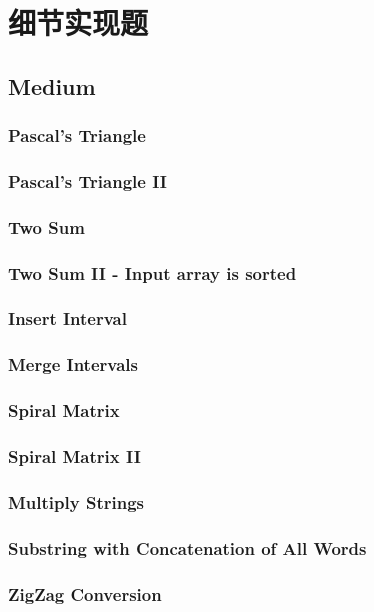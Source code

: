 \documentclass[12pt]{book}
\begin{document}
\chapter{细节实现题}
\label{sec-20}
\section{Medium}
\label{sec-20-1}
\subsection{Pascal's Triangle}
\label{sec-20-1-1}
\subsection{Pascal's Triangle II}
\label{sec-20-1-2}
\subsection{Two Sum}
\label{sec-20-1-3}
\subsection{Two Sum II - Input array is sorted}
\label{sec-20-1-4}
\subsection{Insert Interval}
\label{sec-20-1-5}
\subsection{Merge Intervals}
\label{sec-20-1-6}
\subsection{Spiral Matrix}
\label{sec-20-1-7}
\subsection{Spiral Matrix II}
\label{sec-20-1-8}
\subsection{Multiply Strings}
\label{sec-20-1-9}
\subsection{Substring with Concatenation of All Words}
\label{sec-20-1-10}
\subsection{ZigZag Conversion}
\label{sec-20-1-11}
\end{document}
